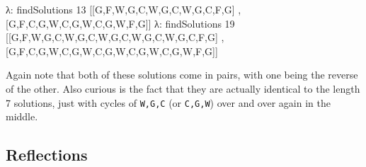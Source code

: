 \documentclass[]{article}
\newenvironment{Shaded}{}{}
\newcommand{\DataTypeTok}[1]{\textcolor[rgb]{0.56,0.13,0.00}{{#1}}}
\newcommand{\DecValTok}[1]{\textcolor[rgb]{0.25,0.63,0.44}{{#1}}}
\newcommand{\FunctionTok}[1]{\textcolor[rgb]{0.02,0.16,0.49}{{#1}}}
\newcommand{\NormalTok}[1]{{#1}}
\begin{document}
\begin{Shaded}
\begin{Highlighting}[]
\NormalTok{λ}\FunctionTok{:} \NormalTok{findSolutions }\DecValTok{13}
\NormalTok{[[}\DataTypeTok{G}\NormalTok{,}\DataTypeTok{F}\NormalTok{,}\DataTypeTok{W}\NormalTok{,}\DataTypeTok{G}\NormalTok{,}\DataTypeTok{C}\NormalTok{,}\DataTypeTok{W}\NormalTok{,}\DataTypeTok{G}\NormalTok{,}\DataTypeTok{C}\NormalTok{,}\DataTypeTok{W}\NormalTok{,}\DataTypeTok{G}\NormalTok{,}\DataTypeTok{C}\NormalTok{,}\DataTypeTok{F}\NormalTok{,}\DataTypeTok{G}\NormalTok{]}
\NormalTok{,[}\DataTypeTok{G}\NormalTok{,}\DataTypeTok{F}\NormalTok{,}\DataTypeTok{C}\NormalTok{,}\DataTypeTok{G}\NormalTok{,}\DataTypeTok{W}\NormalTok{,}\DataTypeTok{C}\NormalTok{,}\DataTypeTok{G}\NormalTok{,}\DataTypeTok{W}\NormalTok{,}\DataTypeTok{C}\NormalTok{,}\DataTypeTok{G}\NormalTok{,}\DataTypeTok{W}\NormalTok{,}\DataTypeTok{F}\NormalTok{,}\DataTypeTok{G}\NormalTok{]]}
\NormalTok{λ}\FunctionTok{:} \NormalTok{findSolutions }\DecValTok{19}
\NormalTok{[[}\DataTypeTok{G}\NormalTok{,}\DataTypeTok{F}\NormalTok{,}\DataTypeTok{W}\NormalTok{,}\DataTypeTok{G}\NormalTok{,}\DataTypeTok{C}\NormalTok{,}\DataTypeTok{W}\NormalTok{,}\DataTypeTok{G}\NormalTok{,}\DataTypeTok{C}\NormalTok{,}\DataTypeTok{W}\NormalTok{,}\DataTypeTok{G}\NormalTok{,}\DataTypeTok{C}\NormalTok{,}\DataTypeTok{W}\NormalTok{,}\DataTypeTok{G}\NormalTok{,}\DataTypeTok{C}\NormalTok{,}\DataTypeTok{W}\NormalTok{,}\DataTypeTok{G}\NormalTok{,}\DataTypeTok{C}\NormalTok{,}\DataTypeTok{F}\NormalTok{,}\DataTypeTok{G}\NormalTok{]}
\NormalTok{,[}\DataTypeTok{G}\NormalTok{,}\DataTypeTok{F}\NormalTok{,}\DataTypeTok{C}\NormalTok{,}\DataTypeTok{G}\NormalTok{,}\DataTypeTok{W}\NormalTok{,}\DataTypeTok{C}\NormalTok{,}\DataTypeTok{G}\NormalTok{,}\DataTypeTok{W}\NormalTok{,}\DataTypeTok{C}\NormalTok{,}\DataTypeTok{G}\NormalTok{,}\DataTypeTok{W}\NormalTok{,}\DataTypeTok{C}\NormalTok{,}\DataTypeTok{G}\NormalTok{,}\DataTypeTok{W}\NormalTok{,}\DataTypeTok{C}\NormalTok{,}\DataTypeTok{G}\NormalTok{,}\DataTypeTok{W}\NormalTok{,}\DataTypeTok{F}\NormalTok{,}\DataTypeTok{G}\NormalTok{]]}
\end{Highlighting}
\end{Shaded}

Again note that both of these solutions come in pairs, with one being the
reverse of the other. Also curious is the fact that they are actually identical
to the length 7 solutions, just with cycles of \texttt{W,G,C} (or
\texttt{C,G,W}) over and over again in the middle.

\subsection{Reflections}\label{reflections}
\end{document}
